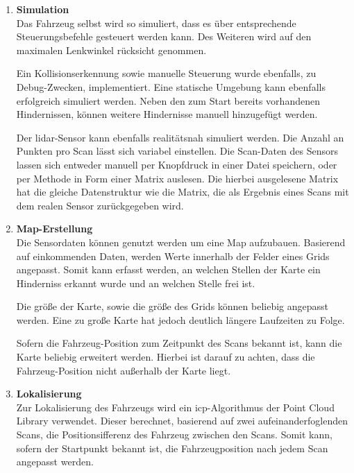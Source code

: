 \begin{enumerate}[leftmargin=*]
    \item \textbf{Simulation} \\
    Das Fahrzeug selbst wird so simuliert, dass es über entsprechende Steuerungsbefehle gesteuert werden kann.
    Des Weiteren wird auf den maximalen Lenkwinkel rücksicht genommen.
    
    Ein Kollisionserkennung sowie manuelle Steuerung wurde ebenfalls, zu Debug-Zwecken, implementiert.
    Eine statische Umgebung kann ebenfalls erfolgreich simuliert werden.
    Neben den zum Start bereits vorhandenen Hindernissen, können weitere Hindernisse manuell hinzugefügt werden.
    
    Der \ac{lidar}-Sensor kann ebenfalls realitätsnah simuliert werden.
    Die Anzahl an Punkten pro Scan lässt sich variabel einstellen.
    Die Scan-Daten des Sensors lassen sich entweder manuell per Knopfdruck in einer Datei speichern, 
    oder per Methode in Form einer Matrix auslesen.
    Die hierbei ausgelesene Matrix hat die gleiche Datenstruktur wie die Matrix, 
    die als Ergebnis eines Scans mit dem realen Sensor zurückgegeben wird.

    \item \textbf{Map-Erstellung} \\
    Die Sensordaten können genutzt werden um eine Map aufzubauen.
    Basierend auf einkommenden Daten, werden Werte innerhalb der Felder eines Grids angepasst.
    Somit kann erfasst werden, an welchen Stellen der Karte ein Hinderniss erkannt wurde und an welchen Stelle frei ist.
    
    Die größe der Karte, sowie die größe des Grids können beliebig angepasst werden.
    Eine zu große Karte hat jedoch deutlich längere Laufzeiten zu Folge.

    Sofern die Fahrzeug-Position zum Zeitpunkt des Scans bekannt ist, kann die Karte beliebig erweitert werden.
    Hierbei ist darauf zu achten, dass die Fahrzeug-Position nicht außerhalb der Karte liegt.

    \item \textbf{Lokalisierung} \\
    Zur Lokalisierung des Fahrzeugs wird ein \ac{icp}-Algorithmus der Point Cloud Library verwendet.
    Dieser berechnet, basierend auf zwei aufeinanderfoglenden Scans, die Positionsifferenz des Fahrzeug zwischen den Scans.
    Somit kann, sofern der Startpunkt bekannt ist, die Fahrzeugposition nach jedem Scan angepasst werden.


\end{enumerate}
